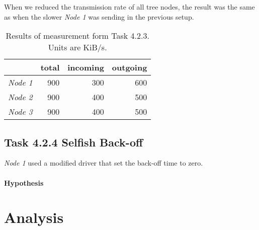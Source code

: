 \documentclass[12pt,a4paper]{article}
\begin{document}
When we reduced the transmission rate of all tree nodes, the result was the same as when the slower \emph{Node 1} was sending in the previous setup.

\begin{table}
	\begin{center}
		\begin{tabular}{r|r|r|r}\
		 & total & incoming & outgoing \\
		 \hline 
		 \emph{Node 1} & 900 & 300 & 600 \\
		 \emph{Node 2} & 900 & 400 & 500 \\
		 \emph{Node 3} & 900 & 400 & 500 \\
		\end{tabular}
		\label{table_4_2_3}
		\caption{Results of measurement form Task 4.2.3. Units are KiB/s.}
		
	\end{center}
	\end{table}

\subsection{Task 4.2.4 Selfish Back-off}
\emph{Node 1} used a modified driver that set the back-off time to zero.

\paragraph{Hypothesis}
	

\section{Analysis}


\end{document}
